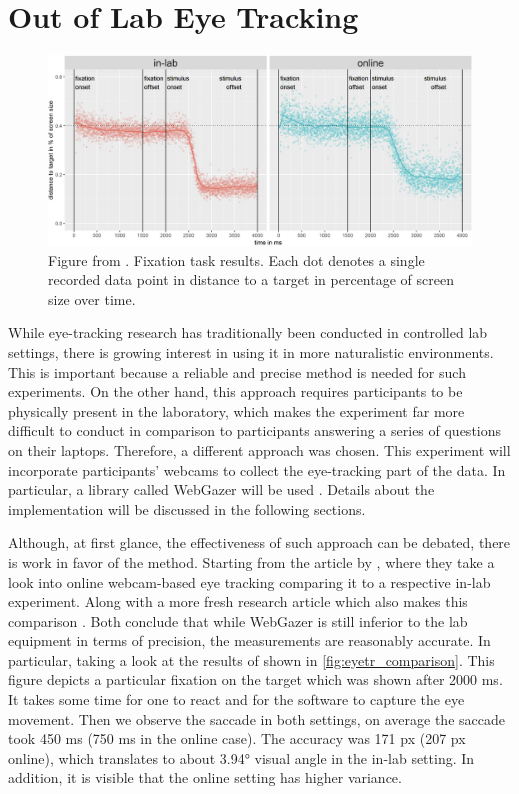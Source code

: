 \section{Out of Lab Eye Tracking} \label{sec:eyetr}
\begin{figure}
    \centering
    \includegraphics[width=1\linewidth]{images/tracker_comparison.png}
    \caption{Figure from \cite{Semmelmann_2018}. Fixation task results. Each dot denotes a single recorded data point in distance to a target in percentage of screen size over time.}
    \label{fig:eyetr_comparison}
\end{figure}
While eye-tracking research has traditionally been conducted in controlled lab settings, there is growing interest in using it in more naturalistic environments. This is important because a reliable and precise method is needed for such experiments. On the other hand, this approach requires participants to be physically present in the laboratory, which makes the experiment far more difficult to conduct in comparison to participants answering a series of questions on their laptops. Therefore, a different approach was chosen. This experiment will incorporate participants' webcams to collect the eye-tracking part of the data. In particular, a library called WebGazer will be used \citep{webgazer}. Details about the implementation will be discussed in the following sections. 

Although, at first glance, the effectiveness of such approach can be debated, there is work in favor of the method. Starting from the article by \cite{Semmelmann_2018}, where they take a look into online webcam-based eye tracking comparing it to a respective in-lab experiment. Along with a more fresh research article which also makes this comparison \citep{Wisiecka_2022}. Both conclude that while WebGazer is still inferior to the lab equipment in terms of precision, the measurements are reasonably accurate. In particular, taking a look at the results of \cite{Semmelmann_2018} shown in \autoref{fig:eyetr_comparison}. This figure depicts a particular fixation on the target which was shown after 2000 ms. It takes some time for one to react and for the software to capture the eye movement. Then we observe the saccade in both settings, on average the saccade took 450 ms (750 ms in the online case). The accuracy was 171 px (207 px online), which translates to about 3.94° visual angle in the in-lab setting. In addition, it is visible that the online setting has higher variance.

